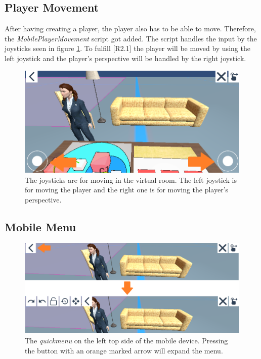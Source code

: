 \subsection{Player Movement}
After having creating a player, the player also has to be able to move.
Therefore, the \textit{MobilePlayerMovement} script got added.
The script handles the input by the joysticks seen in figure \ref{fig:joystick}.
To fulfill [R2.1] the player will be moved by using the left joystick and the player's perspective will be handled by the right joystick.


\begin{figure}[htb]
    \centering
    \includegraphics[width=1\textwidth]{Implementation/img/joysticks.png}
    \caption{The joysticks are for moving in the virtual room. The left joystick is for moving the player and the right one is for moving the player's perspective.}\label{fig:joystick}
\end{figure}

\subsection{Mobile Menu}
\label{sec:menu}
\begin{figure}[htb]
    \centering
    \includegraphics[width=1\textwidth]{Implementation/img/quickmenu.png}
    \caption{The \textit{quickmenu} on the left top side of the mobile device. Pressing the button with an orange marked arrow will expand the menu.}\label{fig:quickmenu}
\end{figure}

